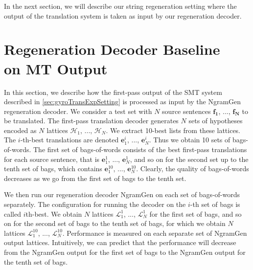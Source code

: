 In the next section, we will describe our string regeneration setting where
the output of the translation system is taken as input by our
regeneration decoder.

\section[Regeneration Decoder Baseline on MT Output]{Regeneration Decoder Baseline \\ on MT Output}
\label{sec:gyroTransBaseline}


In this section, we describe how the first-pass output
of the SMT system described in \autoref{sec:gyroTransExpSetting}
is processed as input by the NgramGen regeneration decoder.
We consider a test set with $N$ source sentences
$\bm{f_1}$, ..., $\bm{f_N}$ to be translated.
The first-pass translation decoder generates $N$ sets of hypotheses %
encoded as $N$ lattices $\mathcal{H}_1$, ..., $\mathcal{H}_N$.
We extract 10-best lists from these lattices.
The $i$-th-best translations are denoted $\bm{e}_1^i$, ..., $\bm{e}_N^i$.
Thus we obtain
10 sets of bags-of-words. The first set of bags-of-words consists
of the best first-pass translations for each source sentence, that is
$\bm{e}_1^1$, ..., $\bm{e}_N^1$, and so on
for the second set up to the tenth set of bags, which contains
$\bm{e}_1^{10}$, ..., $\bm{e}_N^{10}$. Clearly, the quality of
bags-of-words decreases as we go from the first set of bags to the
tenth set.

We then run our regeneration decoder
NgramGen on each
set of bags-of-words separately. The configuration for running
the decoder on the $i$-th set of bags is called $i$th-best.
We obtain
$N$ lattices $\mathcal{L}_1^1$, ..., $\mathcal{L}_N^1$ for the first set of bags,
and so on for the second set of bags to the tenth set of bags, for which we
obtain $N$ lattices $\mathcal{L}_1^{10}$, ..., $\mathcal{L}_N^{10}$.
Performance is measured
on each separate set of NgramGen output lattices.
Intuitively, we can predict that the performance will decrease from
the NgramGen output for the first set of bags to the NgramGen output for
the tenth set of bags.

